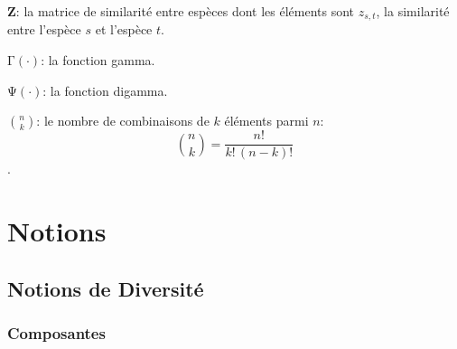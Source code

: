 \documentclass[
  11pt,
  french,
  a4paper,
  extrafontsizes,onecolumn,openright
  ]{memoir}
\begin{document}
\noindent \(\mathbf{Z}\): la matrice de similarité entre espèces dont les éléments sont \(z_{s,t}\), la similarité entre l'espèce \(s\) et l'espèce \(t\).

\noindent \(\mathrm{\Gamma}(\cdot)\): la fonction gamma.

\noindent \(\mathrm{\Psi}(\cdot)\): la fonction digamma.

\noindent \(\binom{n}{k}\): le nombre de combinaisons de \(k\) éléments parmi \(n\): \[\binom{n}{k}=\frac{n!}{k!\,(n-k)!}\].

\mainmatter

\hypertarget{part-notions}{%
\part{Notions}\label{part-notions}}

\hypertarget{chap-Notions}{%
\chapter{Notions de Diversité}\label{chap-Notions}}

\hypertarget{composantes}{%
\section{Composantes}\label{composantes}}



\scriptsize
\end{document}
